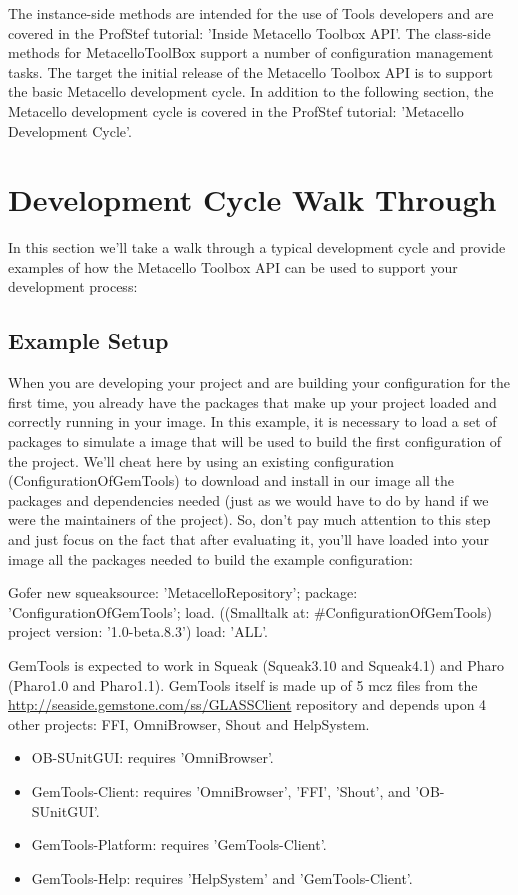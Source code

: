\documentclass[a4paper,10pt,twoside]{book}
\begin{document}
\begin{code}{}
\begin{code}{}
The instance-side methods are intended for the use of Tools developers and are covered in the ProfStef tutorial: 'Inside Metacello Toolbox API'. The class-side methods for MetacelloToolBox support a number of configuration management tasks. The target the initial release of the Metacello Toolbox API is to support the basic Metacello development cycle. In addition to the following section, the Metacello development cycle is covered in the ProfStef tutorial: 'Metacello Development Cycle'.


\section{Development Cycle Walk Through}

In this section we'll take a walk through a typical development cycle and provide examples of how the Metacello Toolbox API can be used to support your development process:

\subsection{Example Setup}

When you are developing your project and are building your configuration for the first time, you already have the packages that make up your project loaded and correctly running in your image. In this example, it is necessary to load a set of packages to simulate a image that will be used to build the first configuration of the project. We'll cheat here by using an existing configuration (ConfigurationOfGemTools) to download and install in our image all the packages and dependencies needed (just as we would have to do by hand if we were the maintainers of the project). So, don't pay much attention to this step and just focus on the fact that after evaluating it, you'll have loaded into your image all the packages needed to build the example configuration:

\begin{code}{}
Gofer new
  squeaksource: 'MetacelloRepository';
  package: 'ConfigurationOfGemTools';
  load.
((Smalltalk at: #ConfigurationOfGemTools) project version: '1.0-beta.8.3')
  load: 'ALL'.
\end{code}

GemTools is expected to work in Squeak (Squeak3.10 and Squeak4.1) and Pharo (Pharo1.0 and Pharo1.1). GemTools itself is made up of 5 mcz files from the \url{http://seaside.gemstone.com/ss/GLASSClient} repository and  depends upon 4 other projects: FFI, OmniBrowser, Shout and HelpSystem. 
\begin{itemize}
\item OB-SUnitGUI: requires 'OmniBrowser'. 
\item GemTools-Client: requires 'OmniBrowser', 'FFI', 'Shout', and 'OB-SUnitGUI'. 
\item GemTools-Platform: requires 'GemTools-Client'. 
\item GemTools-Help: requires 'HelpSystem' and 'GemTools-Client'. 
\end{itemize}



\end{code}
\end{code}
\end{document}
